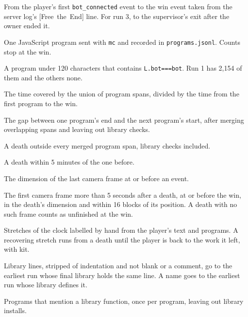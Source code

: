 \documentclass[11pt,a4paper]{article}
\newcommand{\adv}[1]{\mbox{\textsf{[#1]}}}
\begin{document}
\begin{description}[leftmargin=0pt,itemsep=3pt,font=\normalfont\bfseries]
  \item[Official clock.] From the player's first \texttt{bot\_connected} event to the win event taken from the server log's \adv{Free the End} line. For run 3, to the supervisor's exit after the owner ended it.
  \item[Program.] One JavaScript program sent with \texttt{mc} and recorded in \texttt{programs.jsonl}. Counts stop at the win.
  \item[Library check.] A program under 120 characters that contains \texttt{L.bot===bot}. Run 1 has 2,154 of them and the others none.
  \item[Running share.] The time covered by the union of program spans, divided by the time from the first program to the win.
  \item[Pause.] The gap between one program's end and the next program's start, after merging overlapping spans and leaving out library checks.
  \item[Death between programs.] A death outside every merged program span, library checks included.
  \item[Chain.] A death within 5 minutes of the one before.
  \item[Place.] The dimension of the last camera frame at or before an event.
  \item[Back at the spot.] The first camera frame more than 5 seconds after a death, at or before the win, in the death's dimension and within 16 blocks of its position. A death with no such frame counts as unfinished at the win.
  \item[Working and recovering.] Stretches of the clock labelled by hand from the player's text and programs. A recovering stretch runs from a death until the player is back to the work it left, with kit.
  \item[First written by.] Library lines, stripped of indentation and not blank or a comment, go to the earliest run whose final library holds the same line. A name goes to the earliest run whose library defines it.
  \item[Uses of a name.] Programs that mention a library function, once per program, leaving out library installs.
\end{description}
\end{document}

